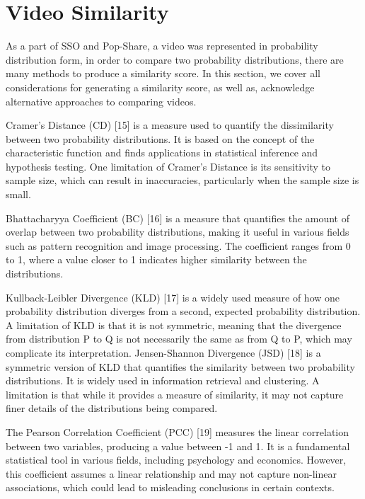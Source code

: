 \section{Video Similarity}

As a part of SSO and Pop-Share, a video was represented in probability distribution form, in order to compare two probability distributions, there are many methods to produce a similarity score. In this section, we cover all considerations for generating a similarity score, as well as, acknowledge alternative approaches to comparing videos.

Cramer’s Distance (CD) [15] is a measure used to quantify the dissimilarity between two probability distributions. It is based on the concept of the characteristic function and finds applications in statistical inference and hypothesis testing. One limitation of Cramer’s Distance is its sensitivity to sample size, which can result in inaccuracies, particularly when the sample size is small.



Bhattacharyya Coefficient (BC) [16] is a measure that quantifies the amount of overlap between two probability distributions, making it useful in various fields such as pattern recognition and image processing. The coefficient ranges from 0 to 1, where a value closer to 1 indicates higher similarity between the distributions.



Kullback-Leibler Divergence (KLD) [17] is a widely used measure of how one probability distribution diverges from a second, expected probability distribution. A limitation of KLD is that it is not symmetric, meaning that the divergence from distribution P to Q is not necessarily the same as from Q to P, which may complicate its interpretation.
Jensen-Shannon Divergence (JSD) [18] is a symmetric version of KLD that quantifies the similarity between two probability distributions. It is widely used in information retrieval and clustering. A limitation is that while it provides a measure of similarity, it may not capture finer details of the distributions being compared.



The Pearson Correlation Coefficient (PCC) [19] measures the linear correlation between two variables, producing a value between -1 and 1. It is a fundamental statistical tool in various fields, including psychology and economics. However, this coefficient assumes a linear relationship and may not capture non-linear associations, which could lead to misleading conclusions in certain contexts.

